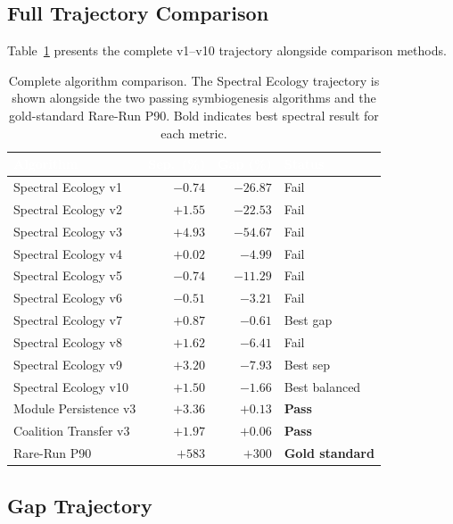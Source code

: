 \documentclass{../yalumba}
\begin{document}
\subsection{Full Trajectory Comparison}

Table~\ref{tab:trajectory} presents the complete v1--v10 trajectory
alongside comparison methods.

\begin{table}[htbp]
\centering
\tablestyle
\caption{Complete algorithm comparison.  The Spectral Ecology trajectory
is shown alongside the two passing symbiogenesis algorithms and the
gold-standard Rare-Run P90.  Bold indicates best spectral result for
each metric.}
\label{tab:trajectory}
\small
\begin{tabular}{@{}lrrl@{}}
\toprule
\rowcolor{table-header}
\textcolor{white}{\textbf{Algorithm}} &
\textcolor{white}{\textbf{Sep.\ (\%)}} &
\textcolor{white}{\textbf{Gap (\%)}} &
\textcolor{white}{\textbf{Status}} \\
\midrule
Spectral Ecology v1   & $-0.74$  & $-26.87$ & Fail \\
Spectral Ecology v2   & $+1.55$  & $-22.53$ & Fail \\
Spectral Ecology v3   & $+4.93$  & $-54.67$ & Fail \\
Spectral Ecology v4   & $+0.02$  & $-4.99$  & Fail \\
Spectral Ecology v5   & $-0.74$  & $-11.29$ & Fail \\
Spectral Ecology v6   & $-0.51$  & $-3.21$  & Fail \\
Spectral Ecology v7   & $+0.87$  & $\mathbf{-0.61}$  & Best gap \\
Spectral Ecology v8   & $+1.62$  & $-6.41$  & Fail \\
Spectral Ecology v9   & $\mathbf{+3.20}$  & $-7.93$  & Best sep \\
\rowcolor{yalumba-cream}
Spectral Ecology v10  & $+1.50$  & $-1.66$  & Best balanced \\
\midrule
Module Persistence v3  & $+3.36$  & $+0.13$  & \textbf{Pass} \\
Coalition Transfer v3  & $+1.97$  & $+0.06$  & \textbf{Pass} \\
Rare-Run P90           & $+583$   & $+300$   & \textbf{Gold standard} \\
\bottomrule
\end{tabular}
\end{table}

\subsection{Gap Trajectory}
\end{document}
